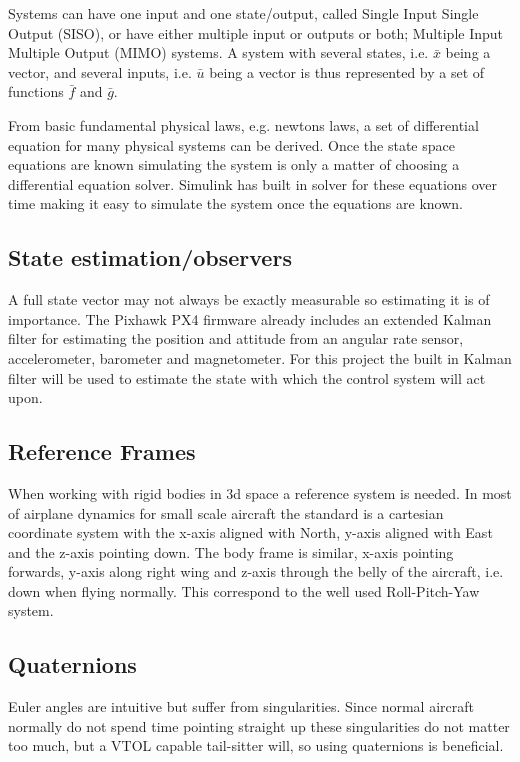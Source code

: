 \documentclass{article}
\begin{document}
Systems can have one input and one state/output, called Single Input Single Output (SISO), or have either multiple input or outputs or both; Multiple Input Multiple Output (MIMO) systems.
A system with several states, i.e. $\bar{x}$ being a vector, and several inputs, i.e. $\bar{u}$ being a vector is thus represented by a set of functions $\bar{f}$ and $\bar{g}$.

From basic fundamental physical laws, e.g. newtons laws, a set of differential equation for many physical systems can be derived.
Once the state space equations are known simulating the system is only a matter of choosing a differential equation solver.
Simulink has built in solver for these equations over time making it easy to simulate the system once the equations are known.

\subsection{State estimation/observers}
A full state vector may not always be exactly measurable so estimating it is of importance.
The Pixhawk PX4 firmware already includes an extended Kalman filter for estimating the position and attitude from an angular rate sensor, accelerometer, barometer and magnetometer.
For this project the built in Kalman filter will be used to estimate the state with which the control system will act upon.

\subsection{Reference Frames}
When working with rigid bodies in 3d space a reference system is needed.
In most of airplane dynamics for small scale aircraft the standard is a cartesian coordinate system with the x-axis aligned with North, y-axis aligned with East and the z-axis pointing down.
The body frame is similar, x-axis pointing forwards, y-axis along right wing and z-axis through the belly of the aircraft, i.e. down when flying normally.
This correspond to the well used Roll-Pitch-Yaw system.\cite{nelson}

\subsection{Quaternions}
Euler angles are intuitive but suffer from singularities.
Since normal aircraft normally do not spend time pointing straight up these singularities do not matter too much, but a VTOL capable tail-sitter will, so using quaternions is beneficial.
\end{document}
